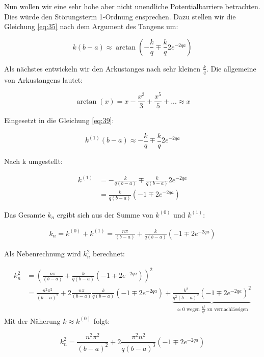 Nun wollen wir eine sehr hohe aber nicht unendliche Potentialbarriere betrachten. Dies würde den Störungsterm 1-Ordnung ensprechen. Dazu stellen wir die Gleichung \eqref{eq:35} nach dem Argument des Tangens um:

\begin{equation}
  \label{eq:39}
    k(b-a) \approx \arctan\left( - \frac{k}{q} \mp \frac{k}{q} 2e^{-2qa}\right)
\end{equation}

Als nächstes entwickeln wir den Arkustanges nach sehr kleinen \(\frac{k}{q}\). Die allgemeine von Arkustangens lautet:

\begin{equation}
  \label{eq:40}
  \arctan(x) = x - \frac{x^3}{3} + \frac{x^5}{5}+...\approx x
\end{equation}

Eingesetzt in die Gleichung \eqref{eq:39}:

\begin{equation}
  \label{eq:41}
    k^{(1)}(b-a) \approx - \frac{k}{q} \mp \frac{k}{q} 2e^{-2qa}
\end{equation}

Nach k umgestellt:

\begin{align}
  \label{eq:42}
  k^{(1)} &= - \frac{k}{q(b-a)} \mp \frac{k}{q(b-a)} 2e^{-2qa}\\
&= \frac{k}{q(b-a)}\left( -1 \mp  2e^{-2qa}\right)
\end{align}

Das Gesamte \(k_n\) ergibt sich aus der Summe von \(k^{(0)}\) und \(k^{(1)}\):

\begin{align}
  \label{eq:43}
  k_n = k^{(0)}+k^{(1)} = \frac{n\pi}{(b-a)} + \frac{k}{q(b-a)}( -1 \mp  2e^{-2qa})
\end{align}

Als Nebenrechnung wird \(k_n^2\) berechnet:

\begin{align}
  \label{eq:44}
  k_n^2 &= (\frac{n\pi}{(b-a)} + \frac{k}{q(b-a)}( -1 \mp  2e^{-2qa}))^2 \\
&=\frac{n^2\pi^2}{(b-a)^2} + 2\frac{n\pi}{(b-a)} \frac{k}{q(b-a)}( -1 \mp  2e^{-2qa}) + \underbrace{\frac{k^2}{q^2(b-a)^2}( -1 \mp  2e^{-2qa})^2}_{\approx 0 \text{ wegen } \frac{k^2}{q^2} \text{ zu vernachlässigen}}
\end{align}
Mit der Näherung \(k \approx k^{(0)}\) folgt:

\begin{equation}
  k_n^2 =\frac{n^2\pi^2}{(b-a)^2} + 2\frac{\pi^2 n^2}{q(b-a)^3}( -1 \mp  2e^{-2qa})\label{eq:45}
\end{equation}

